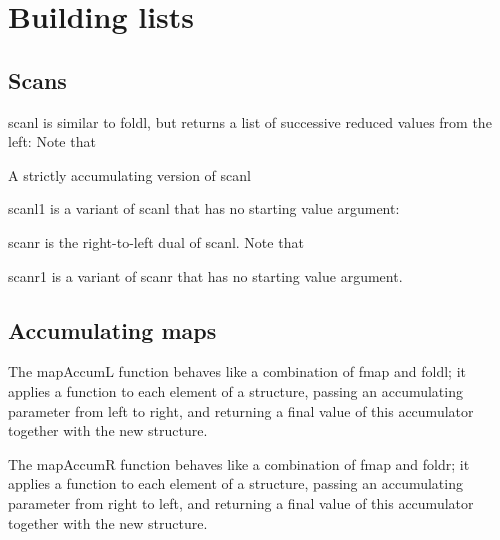 \section{Building lists}
\subsection{Scans}
scanl is similar to foldl, but returns a list of successive reduced values from the left:
Note that

A strictly accumulating version of scanl

scanl1 is a variant of scanl that has no starting value argument:

scanr is the right-to-left dual of scanl. Note that

scanr1 is a variant of scanr that has no starting value argument.

\subsection{Accumulating maps}
The mapAccumL function behaves like a combination of fmap and foldl; it applies a function to each element of a structure, passing an accumulating parameter from left to right, and returning a final value of this accumulator together with the new structure.

The mapAccumR function behaves like a combination of fmap and foldr; it applies a function to each element of a structure, passing an accumulating parameter from right to left, and returning a final value of this accumulator together with the new structure.

